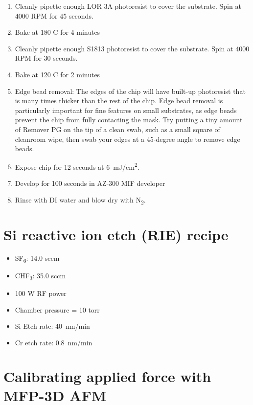 \documentclass[double,12pt,1in,seploa]{beavtex}
\let\Oldsection\section
\renewcommand{\section}{\FloatBarrier\Oldsection}
\begin{document}
\begin{enumerate}
    \item Cleanly pipette enough LOR 3A photoresist to cover the substrate. Spin at 4000 RPM for 45 seconds.
    \item Bake at 180 C for 4 minutes
    \item Cleanly pipette enough S1813 photoresist to cover the substrate. Spin at 4000 RPM for 30 seconds.
    \item Bake at 120 C for 2 minutes
    \item Edge bead removal: The edges of the chip will have built-up photoresist that is many times thicker than the rest of the chip. Edge bead removal is particularly important for fine features on small substrates, as edge beads prevent the chip from fully contacting the mask. Try putting a tiny amount of Remover PG on the tip of a clean swab, such as a small square of cleanroom wipe, then swab your edges at a 45-degree angle to remove edge beads. 
    \item Expose chip for 12 seconds at \SI{6}{\milli\joule/\centi\meter^2}.
    \item Develop for 100 seconds in AZ-300 MIF developer
    \item Rinse with DI water and blow dry with N\textsubscript{2}.
\end{enumerate}

\section{Si reactive ion etch (RIE) recipe}\label{Si RIE recipe}

\begin{itemize}
    \item SF\textsubscript{6}: 14.0 sccm
    \item CHF\textsubscript{3}: 35.0 sccm
    \item 100 W RF power
    \item Chamber pressure = 10 torr
    \item Si Etch rate: \SI{40}{\nano\meter/\minute}
    \item Cr etch rate: \SI{0.8}{\nano\meter/\minute}

\end{itemize}


\section{Calibrating applied force with MFP-3D AFM} \label{force curve appendix}
\end{document}

